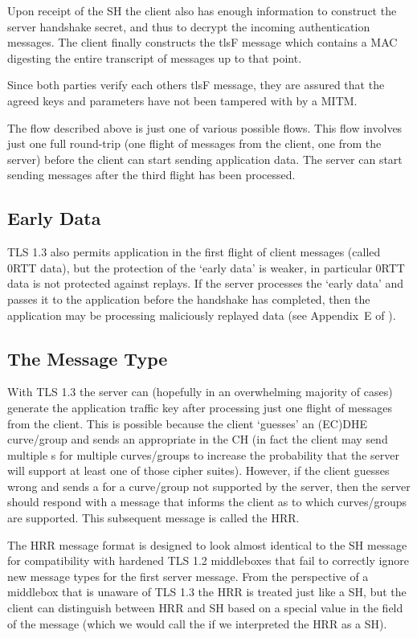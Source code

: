 Upon receipt of the \ac{SH} the client also has enough information to construct the server handshake secret, and thus to decrypt the incoming authentication messages.
The client finally constructs the \ac{tlsF} message which contains a \ac{MAC} digesting the entire transcript of messages up to that point.

Since both parties verify each others \ac{tlsF} message, they are assured that the agreed keys and parameters have not been tampered with by a \ac{MITM}.

The flow described above is just one of various possible flows.
This flow involves just one full round-trip (one flight of messages from the client, one from the server) before the client can start sending application data.
The server can start sending messages after the third flight has been processed.

\subsection{Early Data}
\ac{TLS} 1.3 also permits application in the first flight of client messages (called 0\ac{RTT} data),
but the protection of the `early data' is weaker,
in particular 0\ac{RTT} data is not protected against replays.
If the server processes the `early data' and passes it to the application
before the handshake has completed, then the application
may be processing maliciously replayed data (see Appendix~E of \cite{esni}).

\subsection{The  Message Type}
With TLS 1.3 the server can (hopefully in an overwhelming majority of cases) generate the application traffic key after processing just one flight of messages from the client. This is possible because the client `guesses' an (\ac{EC})\ac{DHE} curve/group and sends an appropriate  in the \ac{CH} (in fact the client may send multiple s for multiple curves/groups to increase the probability that the server will support at least one of those cipher suites).
However, if the client guesses wrong and sends a  for a curve/group not supported by the server,
then the server should respond with a message that informs the client as to which curves/groups are supported.
This subsequent message is called the \ac{HRR}.

The \ac{HRR} message format is designed to look almost identical to the \ac{SH} message for compatibility with hardened \ac{TLS} 1.2 middleboxes that fail to correctly ignore new message types for the first server message.
From the perspective of a middlebox
that is unaware of \ac{TLS} 1.3
the \ac{HRR} is treated just like a \ac{SH},
but the client can distinguish between \ac{HRR} and \ac{SH} based on a special value in the  field of the message
(which we would call the  if we interpreted the \ac{HRR} as a \ac{SH}).

